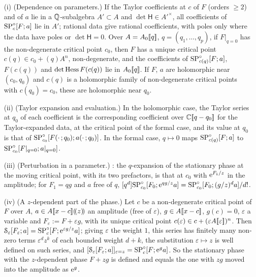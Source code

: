 \begin{lem}[Parameters]
\label{lem:fsp-param}
(i) (Dependence on parameters.) If the Taylor coefficients at $c$ of $F$ (orders $\geq2$) and of $a$ lie in a $\mathbb{Q}$-subalgebra $A'\subset A$ and $\det\mathsf H\in A'^\times$, all coefficients of $\mathrm{SP}^{\circ}_c[F;a]$ lie in $A'$; rational data give rational coefficients, with poles only where the data have poles or $\det\mathsf H=0$. Over $A=A_0[\![ q ]\!]$, $q=(q_1,\dots,q_p)$, if $F|_{q=0}$ has the non-degenerate critical point $c_0$, then $F$ has a unique critical point $c(q)\in c_0+(q)A^n$, non-degenerate, and the coefficients of $\mathrm{SP}^{\circ}_{c(q)}[F;a]$, $F(c(q))$ and $\det\operatorname{Hess} F(c(q))$ lie in $A_0[\![ q ]\!]$. If $F$, $a$ are holomorphic near $(c_0,q_0)$ and $c(q)$ is a holomorphic family of non-degenerate critical points with $c(q_0)=c_0$, these are holomorphic near $q_0$.

(ii) (Taylor expansion and evaluation.) In the holomorphic case, the Taylor series at $q_0$ of each coefficient is the corresponding coefficient over $\mathbb{C}[\![ q-q_0 ]\!]$ for the Taylor-expanded data, at the critical point of the formal case, and its value at $q_0$ is that of $\mathrm{SP}^{\circ}_{c_0}[F(\cdot\,;q_0);a(\cdot\,;q_0)]$. In the formal case, $q\mapsto0$ maps $\mathrm{SP}^{\circ}_{c(q)}[F;a]$ to $\mathrm{SP}^{\circ}_{c_0}[F|_{q=0};a|_{q=0}]$.

(iii) (Perturbation in a parameter.) : the $q$-expansion of the stationary phase at the moving critical point, with its two prefactors, is that at $c_0$ with $\mathrm{e}^{F_1/z}$ in the amplitude; for $F_1=qg$ and $a$ free of $q$, $[q^d]\mathrm{SP}^{\circ}_{c_0}[F_0;\mathrm{e}^{qg/z}a]=\mathrm{SP}^{\circ}_{c_0}[F_0;(g/z)^da]/d!$.

(iv) (A $z$-dependent part of the phase.) Let $c$ be a non-degenerate critical point of $F$ over $A$, $a\in A[\![ x-c ]\!](\!(z)\!)$ an amplitude (free of $\varepsilon$), $g\in A[\![ x-c ]\!]$, $g(c)=0$, $\varepsilon$ a variable and $F_\varepsilon:=F+\varepsilon g$, with its unique critical point $c(\varepsilon)\in c+(\varepsilon A[\![ \varepsilon ]\!])^n$. Then $\mathcal S_\varepsilon[F_\varepsilon;a]=\mathrm{SP}^{\circ}_c[F;\mathrm{e}^{\varepsilon g/z}a]$; giving $\varepsilon$ the weight $1$, this series has finitely many non-zero terms $\varepsilon^dz^k$ of each bounded weight $d+k$, the substitution $\varepsilon\mapsto z$ is well defined on such series, and $[\mathcal S_\varepsilon[F_\varepsilon;a]]_{\varepsilon=z}=\mathrm{SP}^{\circ}_c[F;\mathrm{e}^ga]$. So the stationary phase with the $z$-dependent phase $F+zg$ is defined and equals the one with $zg$ moved into the amplitude as $\mathrm{e}^g$.
\end{lem}

